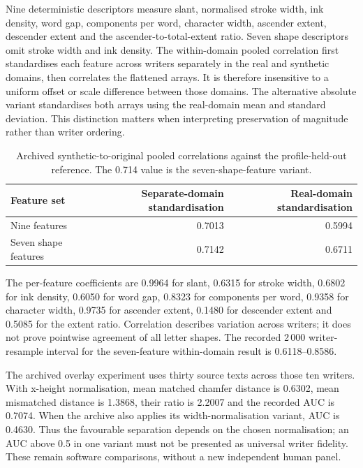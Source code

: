 Nine deterministic descriptors measure slant, normalised stroke width, ink density, word gap, components per word, character width, ascender extent, descender extent and the ascender-to-total-extent ratio. Seven shape descriptors omit stroke width and ink density. The within-domain pooled correlation first standardises each feature across writers separately in the real and synthetic domains, then correlates the flattened arrays. It is therefore insensitive to a uniform offset or scale difference between those domains. The alternative absolute variant standardises both arrays using the real-domain mean and standard deviation. This distinction matters when interpreting preservation of magnitude rather than writer ordering.

\begin{table}[!htbp]\centering\small
\begin{tabular}{lrr}\toprule
\textbf{Feature set} & \textbf{Separate-domain standardisation} & \textbf{Real-domain standardisation}\\\midrule
Nine features & 0.7013 & 0.5994\\
Seven shape features & 0.7142 & 0.6711\\\bottomrule
\end{tabular}
\caption{Archived synthetic-to-original pooled correlations against the profile-held-out reference. The 0.714 value is the seven-shape-feature variant.}\label{tab:app-style-variants}\end{table}

The per-feature coefficients are 0.9964 for slant, 0.6315 for stroke width, 0.6802 for ink density, 0.6050 for word gap, 0.8323 for components per word, 0.9358 for character width, 0.9735 for ascender extent, 0.1480 for descender extent and 0.5085 for the extent ratio. Correlation describes variation across writers; it does not prove pointwise agreement of all letter shapes. The recorded 2\,000 writer-resample interval for the seven-feature within-domain result is 0.6118--0.8586.

The archived overlay experiment uses thirty source texts across those ten writers. With x-height normalisation, mean matched chamfer distance is 0.6302, mean mismatched distance is 1.3868, their ratio is 2.2007 and the recorded AUC is 0.7074. When the archive also applies its width-normalisation variant, AUC is 0.4630. Thus the favourable separation depends on the chosen normalisation; an AUC above 0.5 in one variant must not be presented as universal writer fidelity. These remain software comparisons, without a new independent human panel.


